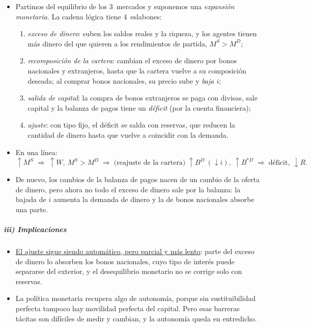 \documentclass[11pt]{article}
\begin{document}
\begin{itemize}
\item Partimos del equilibrio de los 3~mercados y suponemos una \emph{expansión monetaria}. La cadena lógica tiene 4~eslabones:
  \begin{enumerate}
  \item \emph{exceso de dinero}: suben los saldos reales y la riqueza, y los agentes tienen más dinero del que quieren a los rendimientos de partida, $M^S>M^D$;
  \item \emph{recomposición de la cartera}: cambian el exceso de dinero por bonos nacionales y extranjeros, hasta que la cartera vuelve a su composición deseada; al comprar bonos nacionales, su precio sube y \emph{baja $i$};
  \item \emph{salida de capital}: la compra de bonos extranjeros se paga con divisas, sale capital y la balanza de pagos tiene un \emph{déficit} (por la cuenta financiera);
  \item \emph{ajuste}: con tipo fijo, el déficit se salda con reservas, que reducen la cantidad de dinero hasta que vuelve a coincidir con la demanda.
  \end{enumerate}
\item En una línea:
  \[
  \uparrow M^S\;\Rightarrow\;\uparrow W,\ M^S>M^D\;\Rightarrow\;\text{(reajuste de la cartera)}\;\uparrow B^D\ (\downarrow i),\ \uparrow B^{*D}\;\Rightarrow\;\text{déficit},\ \downarrow R .
  \]
\item De nuevo, los cambios de la balanza de pagos nacen de un cambio de la oferta de dinero, pero ahora no todo el exceso de dinero sale por la balanza: la bajada de $i$ aumenta la demanda de dinero y la de bonos nacionales absorbe una parte.
\end{itemize}

\subparagraph{iii) Implicaciones}

\begin{itemize}
\item \uline{El ajuste sigue siendo automático, pero parcial y más lento}: parte del exceso de dinero lo absorben los bonos nacionales, cuyo tipo de interés puede separarse del exterior, y el desequilibrio monetario no se corrige solo con reservas.
\item La política monetaria recupera algo de autonomía, porque sin sustituibilidad perfecta tampoco hay movilidad perfecta del capital. Pero esas barreras tácitas son difíciles de medir y cambian, y la autonomía queda en entredicho.
\end{itemize}
\end{document}
